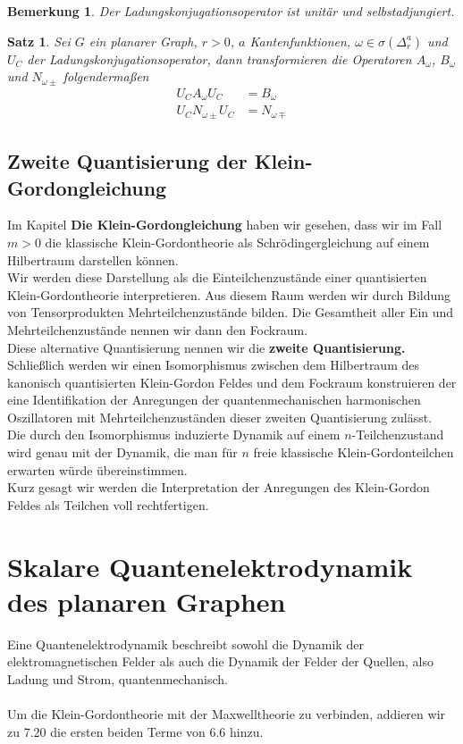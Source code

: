\documentclass[11pt,a4paper,leqno]{report}
\newtheorem{proposition}{Satz}[chapter]
\newtheorem{remark}[theorem]{Bemerkung}
\numberwithin{equation}{chapter}
\begin{document}
\begin{remark}
	Der Ladungskonjugationsoperator ist unit\"ar und selbstadjungiert.
\end{remark}
\begin{proposition}
	Sei $G$ ein planarer Graph, $r>0$, $a$ Kantenfunktionen, $\omega\in\sigma(\Delta_r^a)$ und $U_C$ der Ladungskonjugationsoperator, dann transformieren die Operatoren $A_\omega$, $B_\omega$ und $N_{\omega\pm}$ folgenderma\ss{}en
	\begin{align}
	U_CA_\omega U_C &= B_\omega\\
	U_C N_{\omega \pm} U_C &= N_{\omega \mp}
\end{align}
\end{proposition}
\section{Zweite Quantisierung der Klein-Gordongleichung}
Im Kapitel \textbf{Die Klein-Gordongleichung} haben wir gesehen, dass wir im Fall $m>0$ die klassische Klein-Gordontheorie als Schr\"odingergleichung auf einem Hilbertraum darstellen k\"onnen.\\
Wir werden diese Darstellung als die Einteilchenzust\"ande einer quantisierten Klein-Gordontheorie interpretieren.
Aus diesem Raum werden wir durch Bildung von Tensorprodukten Mehrteilchenzust\"ande bilden. Die Gesamtheit aller Ein und Mehrteilchenzust\"ande nennen wir dann den Fockraum.\\
Diese alternative Quantisierung nennen wir die \textbf{zweite Quantisierung.}\\
 Schlie\ss{}lich werden wir einen Isomorphismus zwischen dem Hilbertraum des kanonisch quantisierten Klein-Gordon Feldes und dem Fockraum konstruieren der eine Identifikation der Anregungen der quantenmechanischen harmonischen Oszillatoren mit Mehrteilchenzust\"anden dieser zweiten Quantisierung zul\"asst.\\
 Die durch den Isomorphismus induzierte Dynamik auf einem $n$-Teilchenzustand wird genau mit der Dynamik, die man f\"ur $n$ freie klassische Klein-Gordonteilchen erwarten w\"urde \"ubereinstimmen.\\
 Kurz gesagt wir werden die Interpretation der Anregungen des Klein-Gordon Feldes als Teilchen voll rechtfertigen.
\chapter{Skalare Quantenelektrodynamik des planaren Graphen}
Eine Quantenelektrodynamik beschreibt sowohl die Dynamik der elektromagnetischen Felder als auch die Dynamik der Felder der Quellen, also Ladung und Strom, quantenmechanisch.\\
\\ 
Um die Klein-Gordontheorie mit der Maxwelltheorie zu verbinden, addieren wir zu 7.20 die ersten beiden Terme von 6.6 hinzu.
\end{document}
